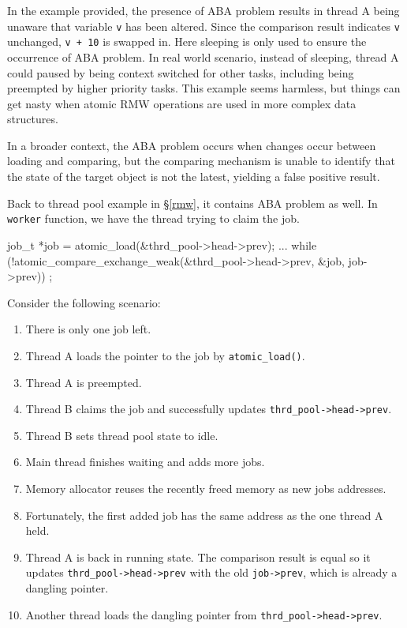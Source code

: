 \documentclass[fontsize=10pt, oneside]{scrartcl}
\newcommand{\monobox}[1]{\mbox{\texttt{#1}}}
\newcommand{\secref}[1]{\hyperref[#1]{\textsc{\S}\ref*{#1}}}
\begin{document}
In the example provided, the presence of ABA problem results in thread A being unaware that variable \monobox{v} has been altered.
Since the comparison result indicates \monobox{v} unchanged, \monobox{v + 10} is swapped in.
Here sleeping is only used to ensure the occurrence of ABA problem.
In real world scenario, instead of sleeping, thread A could paused by being context switched for other tasks, including being preempted by higher priority tasks.
This example seems harmless, but things can get nasty when atomic \textsc{RMW} operations are used in more complex data structures.

In a broader context, the ABA problem occurs when changes occur between loading and comparing, but the comparing mechanism is unable to identify that the state of the target object is not the latest, yielding a false positive result.

Back to thread pool example in \secref{rmw}, it contains ABA problem as well.
In \monobox{worker} function, we have the thread trying to claim the job.

\begin{ccode}
    job_t *job = atomic_load(&thrd_pool->head->prev);
    ...
    while (!atomic_compare_exchange_weak(&thrd_pool->head->prev, &job,
                                           job->prev))
        ;
\end{ccode}

Consider the following scenario:
\begin{enumerate}
    \item There is only one job left.
    \item Thread A loads the pointer to the job by \monobox{atomic\_load()}.
    \item Thread A is preempted.
    \item Thread B claims the job and successfully updates \monobox{thrd\_pool->head->prev}.
    \item Thread B sets thread pool state to idle.
    \item Main thread finishes waiting and adds more jobs.
    \item Memory allocator reuses the recently freed memory as new jobs addresses.
    \item Fortunately, the first added job has the same address as the one thread A held.
    \item Thread A is back in running state. The comparison result is equal so it updates \monobox{thrd\_pool->head->prev} with the old \monobox{job->prev}, which is already a dangling pointer.
    \item Another thread loads the dangling pointer from \monobox{thrd\_pool->head->prev}.
\end{enumerate}
\end{document}
